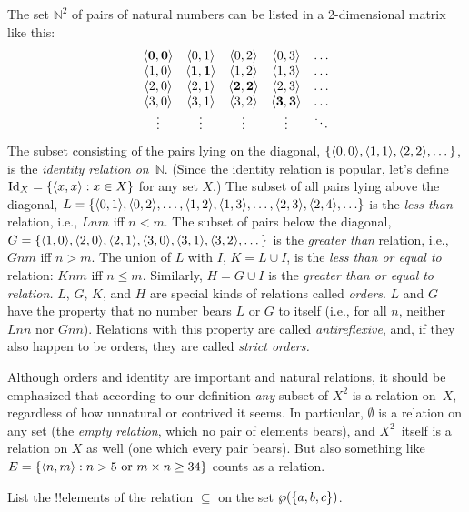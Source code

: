 \documentclass[../../../include/open-logic-section]{subfiles}
\begin{document}
\begin{ex}
The set $\mathbb{N}^{2}$ of
pairs of natural numbers can be listed in a 2-dimensional matrix like
this:
\[
\begin{array}{ccccc}
\mathbf{\tuple{ 0,0 }} & \tuple{ 0,1 } &
  \tuple{ 0,2 } & \tuple{ 0,3 } & \ldots\\
\tuple{ 1,0 } & \mathbf{\tuple{ 1,1 }} &
  \tuple{ 1,2 } & \tuple{ 1,3 } & \ldots\\
\tuple{ 2,0 } & \tuple{ 2,1 } &
  \mathbf{\tuple{ 2,2 }} & \tuple{ 2,3 } & \ldots\\
\tuple{ 3,0 } & \tuple{ 3,1 } & \tuple{ 3,2 } &
  \mathbf{\tuple{ 3,3 }} & \ldots\\
\vdots & \vdots & \vdots & \vdots & \mathbf{\ddots}
\end{array}
\]
The subset consisting of the pairs lying on the diagonal, $\{\langle 
0,0  \rangle, \langle  1,1  \rangle, \langle  2,2  \rangle, \dots\}$, is the
\emph{identity relation on}~$\mathbb{N}$. (Since the identity
relation is popular, let's define $\mathord{\mathrm{Id}_{X}}=\{ \langle  x,x  \rangle : x \in
X \}$ for any set $X$.) The subset of all pairs lying above the
diagonal, $L = \{\langle  0,1  \rangle,\langle  0,2  \rangle,\ldots,\langle 
1,2  \rangle, \langle  1,3  \rangle, \dots, \langle  2,3  \rangle, \langle  2,4
 \rangle,\ldots\}$ is the \emph{less than} relation, i.e., $Lnm$ iff
$n<m$. The subset of pairs below the diagonal, $G=\{ \langle  1,0
 \rangle,\langle  2,0  \rangle,\langle  2,1  \rangle, \langle  3,0
 \rangle,\langle  3,1  \rangle,\langle  3,2  \rangle, \dots\}$ is the
\emph{greater than} relation, i.e., $Gnm$ iff $n>m$. The union of $L$
with $I$, $K=L\cup I$, is the \emph{less than or equal to} relation:
$Knm$ iff $n \le m$. Similarly, $H=G \cup I$ is the \emph{greater than
  or equal to relation.} $L$, $G$, $K$, and $H$ are special kinds of
relations called \emph{orders}. $L$ and $G$ have the property that no
number bears $L$ or $G$ to itself (i.e., for all $n$, neither $Lnn$
nor $Gnn$). Relations with this property are called
\emph{antireflexive}, and, if they also happen to be orders, they are
called \emph{strict orders.}
\end{ex}

\begin{explain}
Although orders and identity are important and natural relations, it
should be emphasized that according to our definition \emph{any}
subset of $X^{2}$ is a relation on~$X$, regardless of how unnatural or
contrived it seems. In particular, $\emptyset$ is a relation on any set
(the \emph{empty relation}, which no pair of elements bears), and
$X^{2}$~itself is a relation on $X$ as well (one which every pair
bears). But also something like $E=\{ \langle n, m \rangle : n>5 \text{ or
  } m \times n \ge 34 \}$ counts as a relation.
\end{explain}

\begin{prob}
List the !!{element}s of the relation $\subseteq$ on the set
$\wp(\{a, b, c\})$.
\end{prob}
\end{document}
